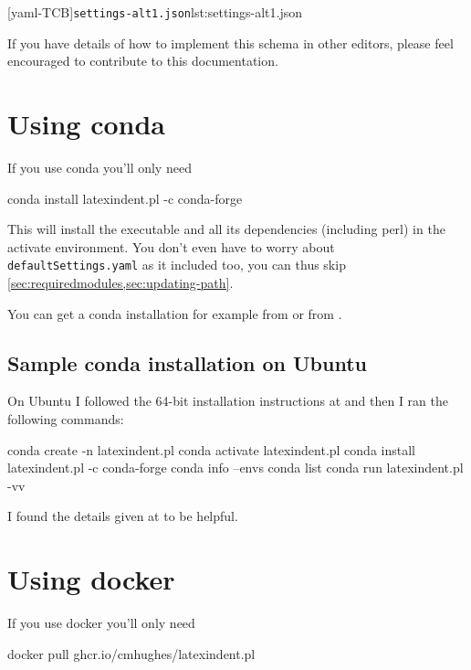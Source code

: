  \begin{widepage}
   [yaml-TCB]{\texttt{settings-alt1.json}}{lst:settings-alt1.json}
  \end{widepage}

  If you have details of how to implement this schema in other editors, please feel
  encouraged to contribute to this documentation.

 \section{Using conda}\label{sec:app:conda}
  If you use conda you'll only need

  \begin{commandshell}
conda install latexindent.pl -c conda-forge
\end{commandshell}

  This will install the executable and all its dependencies (including perl) in the
  activate environment. You don't even have to worry about \texttt{defaultSettings.yaml}
  as it included too, you can thus skip \cref{sec:requiredmodules,sec:updating-path}.

  You can get a conda installation for example from \cite{conda} or from \cite{anacoda}.

 \subsection{Sample conda installation on Ubuntu}
  On Ubuntu I followed the 64-bit installation instructions at \cite{condainstallubuntu}
  and then I ran the following commands:

  \begin{commandshell}
conda create -n latexindent.pl
conda activate latexindent.pl
conda install latexindent.pl -c conda-forge
conda info --envs
conda list
conda run latexindent.pl -vv
\end{commandshell}

  I found the details given at \cite{condainstallhelp} to be helpful.

 \section{Using docker}\label{sec:app:docker}
  If you use docker you'll only need 

  \begin{commandshell}
docker pull ghcr.io/cmhughes/latexindent.pl
\end{commandshell}

